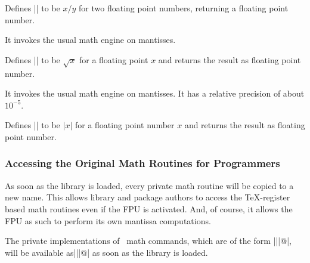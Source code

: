 \begin{command}{}
	Defines |\pgfmathresult| to be $x / y$ for two floating point numbers, returning a floating point number.
	
	It invokes the usual math engine on mantisses.
\end{command}

\begin{command}{}
	Defines |\pgfmathresult| to be $\sqrt x$ for a floating point $x$ and returns the result as floating point number.
	
	It invokes the usual math engine on mantisses. It has a relative precision of about $10^{-5}$.
\end{command}
\begin{command}{}
	Defines |\pgfmathresult| to be $\lvert x\rvert $ for a floating point number $x$ and returns the result as floating point number.
\end{command}

\subsubsection{Accessing the Original Math Routines for Programmers}
As soon as the library is loaded, every private math routine will be copied to a new name.
This allows library and package authors to access the \TeX-register based math routines even if the FPU is activated. And, of course, it allows the FPU as such to perform its own mantissa computations.

The private implementations of \pgfname\ math commands, which are of the form |\pgfmath||@|, will be available as|\pgfmath@basic@||@| as soon as the library is loaded.


